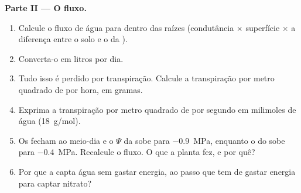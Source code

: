 \begin{problem}
\medskip
\noindent\textbf{Parte II --- O fluxo.}
\begin{enumerate}[resume]
  \item Calcule o fluxo de água para dentro das raízes (condutância
        $\times$ superfície $\times$ a diferença entre o solo e o
         da ).
  \item Converta-o em litros por dia.
  \item Tudo isso é perdido por transpiração. Calcule a transpiração
        por metro quadrado de  por hora, em gramas.
  \item Exprima a transpiração por metro quadrado de  por segundo
        em milimoles de água (\qty{18}{g/mol}).
  \item Os  fecham ao meio-dia e o $\Psi$ da  sobe para
        \qty{-0.9}{MPa}, enquanto o do  sobe para
        \qty{-0.4}{MPa}. Recalcule o fluxo. O que a planta fez, e por
        quê?
  \item Por que a  capta água sem gastar energia, ao passo que tem
        de gastar energia para captar nitrato?
\end{enumerate}


\end{problem}
